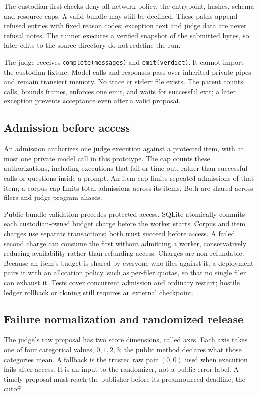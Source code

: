 \documentclass[10pt,twocolumn]{article}
\begin{document}
The custodian first checks deny-all network policy, the entrypoint, hashes, schema and resource caps. A valid bundle may still be declined. These paths append refused entries with fixed reason codes; exception text and judge data are never refusal notes. The runner executes a verified snapshot of the submitted bytes, so later edits to the source directory do not redefine the run.

The judge receives \texttt{complete(messages)} and \texttt{emit(verdict)}. It cannot import the custodian fixture. Model calls and responses pass over inherited private pipes and remain transient memory. No trace or stderr file exists. The parent counts calls, bounds frames, enforces one emit, and waits for successful exit; a later exception prevents acceptance even after a valid proposal.

\subsection{Admission before access}
An admission authorizes one judge execution against a protected item, with at most one private model call in this prototype. The cap counts these authorizations, including executions that fail or time out, rather than successful calls or questions inside a prompt. An item cap limits repeated admissions of that item; a corpus cap limits total admissions across its items. Both are shared across filers and judge-program aliases.

Public bundle validation precedes protected access. SQLite atomically commits each custodian-owned budget charge before the worker starts. Corpus and item charges use separate transactions; both must succeed before access. A failed second charge can consume the first without admitting a worker, conservatively reducing availability rather than refunding access. Charges are non-refundable. Because an item's budget is shared by everyone who files against it, a deployment pairs it with an allocation policy, such as per-filer quotas, so that no single filer can exhaust it. Tests cover concurrent admission and ordinary restart; hostile ledger rollback or cloning still requires an external checkpoint.

\subsection{Failure normalization and randomized release}
The judge's raw proposal has two score dimensions, called axes. Each axis takes one of four categorical values, $0,1,2,3$; the public method declares what those categories mean. A fallback is the trusted raw pair $(0,0)$ used when execution fails after access. It is an input to the randomizer, not a public error label. A timely proposal must reach the publisher before its preannounced deadline, the cutoff.
\end{document}
